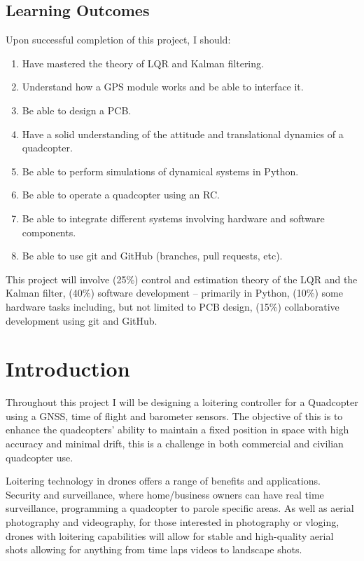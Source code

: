 \documentclass{article}
\begin{document}
\subsection*{Learning Outcomes}
Upon successful completion of this project, I should:
\begin{enumerate}
    \item Have mastered the theory of LQR and Kalman filtering.
    \item Understand how a GPS module works and be able to interface it.
    \item Be able to design a PCB.
    \item Have a solid understanding of the attitude and translational dynamics
    of a quadcopter.
    \item Be able to perform simulations of dynamical systems in Python.
    \item Be able to operate a quadcopter using an RC.
    \item Be able to integrate different systems involving hardware and software
    components.
    \item Be able to use git and GitHub (branches, pull requests, etc).
\end{enumerate}
This project will involve (25\%) control and estimation theory of the LQR and
the Kalman filter, (40\%) software development – primarily in Python, (10\%)
some hardware tasks including, but not limited to PCB design, (15\%)
collaborative development using git and GitHub.

\newpage
\tableofcontents
\newpage

\section{Introduction}
Throughout this project I will be designing a loitering controller for a
Quadcopter using a GNSS, time of flight and barometer sensors. The objective of
this is to enhance the quadcopters' ability to maintain a fixed position in
space with high accuracy and minimal drift, this is a challenge in both
commercial and civilian quadcopter use.

Loitering technology in drones offers a range of benefits and applications.
Security and surveillance, where home/business owners can have real time
surveillance, programming a quadcopter to parole specific areas. As well as
aerial photography and videography, for those interested in photography or
vloging, drones with loitering capabilities will allow for stable and
high-quality aerial shots allowing for anything from time laps videos to
landscape shots.
\end{document}
